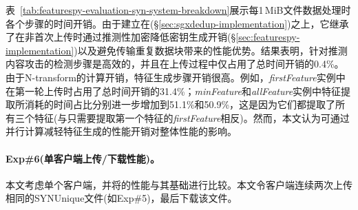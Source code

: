 表~\ref{tab:featurespy-evaluation-syn-system-breakdown}展示每1\,MiB文件数据处理时各个步骤的时间开销。由于\prototype 建立在\sysnameS(\S\ref{sec:sgxdedup-implementation})之上，它继承了在非首次上传时通过推测性加密降低密钥生成开销(\S\ref{sec:featurespy-implementation})以及避免传输重复数据块带来的性能优势。结果表明，针对推测内容攻击的检测步骤是高效的，并且在上传过程中仅占用了总时间开销的0.4\%。由于N-transform的计算开销，特征生成步骤开销很高。例如，\textit{firstFeature}实例中在第一轮上传时占用了总时间开销的31.4\%；\textit{minFeature}和\textit{allFeature}实例中特征提取所消耗的时间占比分别进一步增加到51.1\%和50.9\%，这是因为它们都提取了所有三个特征(与只需要提取第一个特征的\textit{firstFeature}相反)。然而，本文认为可通过并行计算减轻特征生成的性能开销对\prototype 整体性能的影响。

\paragraph*{Exp\#6(单客户端上传/下载性能)。}
本文考虑单个客户端，并将\prototype 的性能与其基础\sysnameS 进行比较。本文令客户端连续两次上传相同的SYNUnique文件(如Exp\#5)，最后下载该文件。

